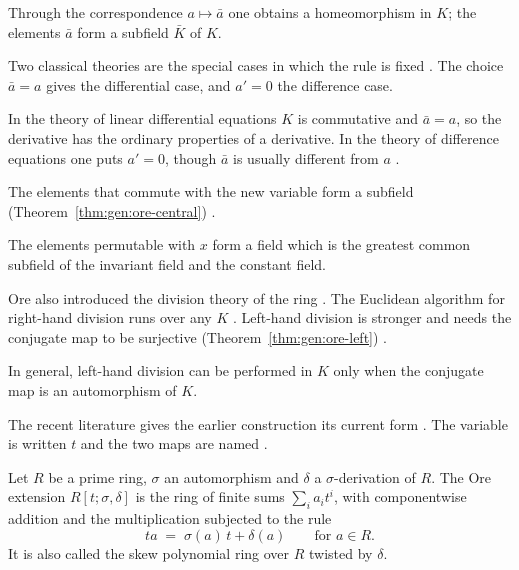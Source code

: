 \begin{theorem}\label{thm:gen:ore-conjugate}
Through the correspondence $a\mapsto\bar a$ one obtains a homeomorphism in
$K$; the elements $\bar a$ form a subfield $\bar K$ of $K$.
\end{theorem}

Two classical theories are the special cases in which the rule is fixed
\cite[p.~482]{Ore1933}. The choice $\bar a=a$ gives the differential case, and
$a'=0$ the difference case.

\begin{remark}\label{rem:gen:ore-two-cases}
In the theory of linear differential equations $K$ is commutative and
$\bar a=a$, so the derivative has the ordinary properties of a derivative. In
the theory of difference equations one puts $a'=0$, though $\bar a$ is usually
different from $a$ \cite[p.~482]{Ore1933}.
\end{remark}

The elements that commute with the new variable form a subfield (Theorem~\ref{thm:gen:ore-central})
\cite[p.~483]{Ore1933}.\begin{theorem}\label{thm:gen:ore-central}
The elements permutable with $x$ form a field which is the greatest common
subfield of the invariant field and the constant field.
\end{theorem}

Ore also introduced the division theory of the ring
\cite[p.~484]{Ore1933}. The Euclidean algorithm
for right-hand division runs over any $K$ \cite[p.~484]{Ore1933}. Left-hand
division is stronger and needs the conjugate map to be surjective (Theorem~\ref{thm:gen:ore-left})
\cite[Theorem~6, p.~480]{Ore1933}.\begin{theorem}\label{thm:gen:ore-left}
In general, left-hand division can be performed in $K$ only when the
conjugate map is an automorphism of $K$.
\end{theorem}

The recent literature gives the earlier construction its current form
\cite[p.~2838]{Chuang2017Auto}. The variable is written $t$ and the two maps
are named \cite[p.~2838]{Chuang2017Auto}.

\begin{definition}\label{def:gen:ore-extension}
Let $R$ be a prime ring, $\sigma$ an automorphism and $\delta$ a
$\sigma$-derivation of $R$. The Ore extension $R[t;\sigma,\delta]$ is the ring
of finite sums $\sum_i a_i t^i$, with componentwise addition and the
multiplication subjected to the rule
\begin{equation*}
t a \;=\; \sigma(a)\, t + \delta(a) \qquad\text{for } a\in R.
\end{equation*}
It is also called the skew polynomial ring over $R$ twisted by $\delta$.
\end{definition}

